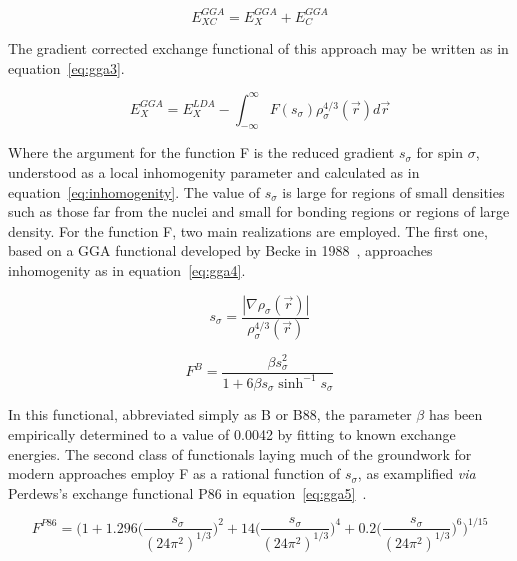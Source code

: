 \documentclass[12pt]{article}
\begin{document}
\begin{equation}
  E_{XC}^{GGA} = E_X^{GGA} + E_C^{GGA}
  \label{eq:gga1}
\end{equation}

\bigskip

\noindent The gradient corrected exchange functional of this approach may be written as in equation~\ref{eq:gga3}.

\begin{equation}
  E_X^{GGA} = E_X^{LDA} - \int_{-\infty}^{\infty} F(s_{\sigma}) \rho_{\sigma}^{4/3}(\vec{r})d\vec{r}
  \label{eq:gga3}
\end{equation}

\bigskip

\noindent Where the argument for the function F is the reduced gradient $s_{\sigma}$ for spin $\sigma$, understood as a local inhomogenity parameter and calculated as in equation~\ref{eq:inhomogenity}.
The value of $s_{\sigma}$ is large for regions of small densities such as those far from the nuclei and small for bonding regions or regions of large density.
For the function F, two main realizations are employed. The first one, based on a GGA functional developed by Becke in 1988~\cite{Becke1988}, approaches inhomogenity as in equation~\ref{eq:gga4}.

\begin{equation}
  s_{\sigma} = \frac{|\nabla\rho_{\sigma}(\vec{r})|}{\rho_{\sigma}^{4/3}(\vec{r})}
  \label{eq:inhomogenity}
\end{equation}

\begin{equation}
  F^{B} = \frac{\beta s^2_{\sigma}}{1 + 6\beta s_{\sigma} \sinh^{-1}s_{\sigma}}
  \label{eq:gga4}
\end{equation}

\bigskip

\noindent In this functional, abbreviated simply as B or B88, the parameter $\beta$ has been empirically determined to a value of 0.0042 by fitting to known exchange energies.
The second class of functionals laying much of the groundwork for modern approaches employ F as a rational function of $s_{\sigma}$, as examplified \textit{via} Perdews's exchange functional P86 in equation~\ref{eq:gga5}~\cite{Perdew1986}.

\begin{equation}
  F^{P86} = \Biggl(1+1.296\biggl(\frac{s_{\sigma}}{(24\pi^2)^{1/3}}\biggl)^2 + 14\biggl(\frac{s_{\sigma}}{(24\pi^2)^{1/3}}\biggl)^4 + 0.2\biggl(\frac{s_{\sigma}}{(24\pi^2)^{1/3}}\biggl)^6 \Biggl)^{1/15}
  \label{eq:gga5}
\end{equation}
\end{document}
